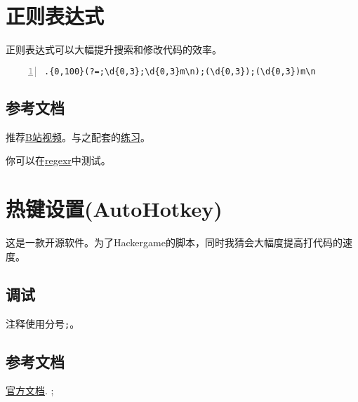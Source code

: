 \documentclass[11pt]{amsart}
\begin{document}
\section{正则表达式}
正则表达式可以大幅提升搜索和修改代码的效率。
\begin{lstlisting}[numbers=left,numberstyle=\tiny,numbersep=10pt]
.{0,100}(?=;\d{0,3};\d{0,3}m\n);(\d{0,3});(\d{0,3})m\n
\end{lstlisting}
\subsection{参考文档}
推荐\href{https://www.bilibili.com/video/BV19t4y1y7qP}{B站视频}。与之配套的\href{https://codejiaonang.com/#/course/regex_chapter1/}{练习}。

你可以在\href{https://regexr-cn.com/}{regexr}中测试。
\section{热键设置(AutoHotkey)}
这是一款开源软件。为了Hackergame的脚本，同时我猜会大幅度提高打代码的速度。
\subsection{调试}

注释使用分号\lstinline|;|。

\subsection{参考文档}
\href{https://wyagd001.github.io/zh-cn/docs/AutoHotkey.htm}{官方文档}.
;
\end{document}
